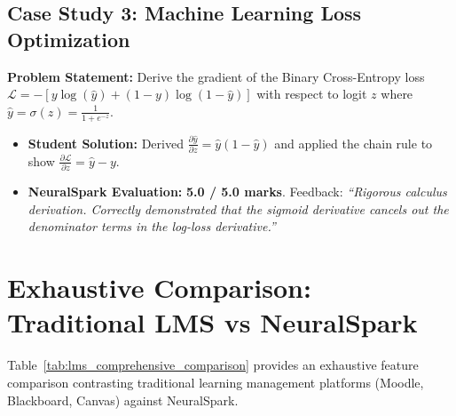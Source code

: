 \subsection{Case Study 3: Machine Learning Loss Optimization}
\textbf{Problem Statement:} Derive the gradient of the Binary Cross-Entropy loss $\mathcal{L} = -[y \log(\hat{y}) + (1-y)\log(1-\hat{y})]$ with respect to logit $z$ where $\hat{y} = \sigma(z) = \frac{1}{1 + e^{-z}}$.
\begin{itemize}[leftmargin=*]
    \item \textbf{Student Solution:} Derived $\frac{\partial \hat{y}}{\partial z} = \hat{y}(1-\hat{y})$ and applied the chain rule to show $\frac{\partial \mathcal{L}}{\partial z} = \hat{y} - y$.
    \item \textbf{NeuralSpark Evaluation:} \textbf{5.0 / 5.0 marks}. Feedback: \textit{``Rigorous calculus derivation. Correctly demonstrated that the sigmoid derivative cancels out the denominator terms in the log-loss derivative.''}
\end{itemize}

\section{Exhaustive Comparison: Traditional LMS vs NeuralSpark}
Table~\ref{tab:lms_comprehensive_comparison} provides an exhaustive feature comparison contrasting traditional learning management platforms (Moodle, Blackboard, Canvas) against NeuralSpark.


